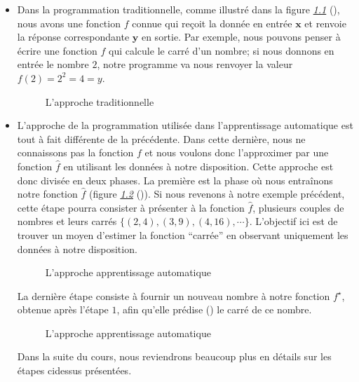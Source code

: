 \documentclass[letterpaper,11pt,english]{sphinxmanual}
\begin{document}
\begin{itemize}
\item {} 
\sphinxAtStartPar
Dans la programmation traditionnelle, comme illustré dans la figure
{\hyperref[\detokenize{chapter3:fig:tradi_prog}]{\emph{1.1}}} (), nous avons une fonction \(f\) connue
qui reçoit la donnée en entrée \(\mathbf{x}\) et renvoie la
réponse correspondante \(\mathbf{y}\) en sortie. Par exemple,
nous pouvons penser à écrire une fonction \(f\) qui calcule le
carré d’un nombre; si nous donnons en entrée le nombre \(2\),
notre programme va nous renvoyer la valeur
\(\displaystyle f(2) = 2^2 = 4 = y\).

\begin{figure}[H]
\centering
\capstart

\noindent{}
\caption{L’approche traditionnelle}\label{\detokenize{chapter3:id4}}\end{figure}

\item {} 
\sphinxAtStartPar
L’approche de la programmation utilisée dans l’apprentissage
automatique est tout à fait différente de la précédente. Dans cette
dernière, nous ne connaissons pas la fonction \(f\) et nous
voulons donc l’approximer par une fonction \(\hat{f}\) en
utilisant les données à notre disposition. Cette approche est donc
divisée en deux phases. La première est la phase où nous entraînons
notre fonction \(\hat{f}\) (figure {\hyperref[\detokenize{chapter3:fig:ML_prog_train}]{\emph{1.2}}} ()).
Si nous revenons à notre exemple précédent, cette étape pourra
consister à présenter à la fonction \(\hat{f}\), plusieurs
couples de nombres et leurs carrés
\(\{(2, 4), (3, 9), (4, 16), \cdots\}\). L’objectif ici est de
trouver un moyen d’estimer la fonction “carrée” en observant
uniquement les données à notre disposition.

\begin{figure}[H]
\centering
\capstart

\noindent{}
\caption{L’approche apprentissage automatique}\label{\detokenize{chapter3:id5}}\end{figure}

\sphinxAtStartPar
La dernière étape consiste à fournir un nouveau nombre à notre
fonction \(f^\star\), obtenue après l’étape \(1\), afin
qu’elle prédise () le carré de ce nombre.

\begin{figure}[H]
\centering
\capstart

\noindent{}
\caption{L’approche apprentissage automatique}\label{\detokenize{chapter3:id6}}\end{figure}

\sphinxAtStartPar
Dans la suite du cours, nous reviendrons beaucoup plus en détails sur
les étapes ci\sphinxhyphen{}dessus présentées.

\end{itemize}
\end{document}
